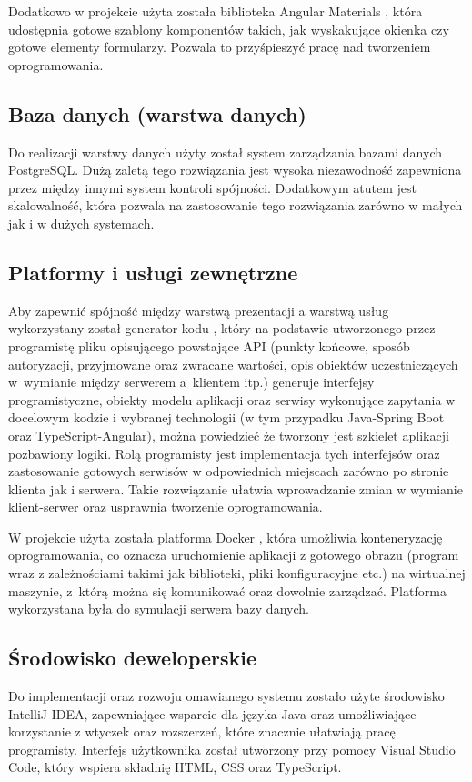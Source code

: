 Dodatkowo w projekcie użyta została biblioteka Angular Materials \cite{bib:angular_materials}, która udostępnia gotowe szablony komponentów takich, jak wyskakujące okienka czy gotowe elementy formularzy. Pozwala to przyśpieszyć pracę nad tworzeniem oprogramowania.

\subsection{Baza danych (warstwa danych)}
Do realizacji warstwy danych użyty został system zarządzania bazami danych PostgreSQL. Dużą zaletą tego rozwiązania jest wysoka niezawodność zapewniona przez między innymi system kontroli spójności. Dodatkowym atutem jest skalowalność, która pozwala na zastosowanie tego rozwiązania zarówno w małych jak i w dużych systemach. 

\subsection{Platformy i usługi zewnętrzne}
Aby zapewnić spójność między warstwą prezentacji a warstwą usług wykorzystany został generator kodu \cite{bib:openapi_generator}, który na podstawie utworzonego przez programistę pliku opisującego powstające API (punkty końcowe, sposób autoryzacji, przyjmowane oraz zwracane wartości, opis obiektów uczestniczących w~wymianie między serwerem a~klientem itp.) generuje interfejsy programistyczne, obiekty modelu aplikacji oraz serwisy wykonujące zapytania w docelowym kodzie i wybranej technologii (w tym przypadku Java-Spring Boot oraz TypeScript-Angular), można powiedzieć że tworzony jest szkielet aplikacji pozbawiony logiki. Rolą programisty jest implementacja tych interfejsów oraz zastosowanie gotowych serwisów w odpowiednich miejscach zarówno po stronie klienta jak i serwera. Takie rozwiązanie ułatwia wprowadzanie zmian w wymianie klient-serwer oraz usprawnia tworzenie oprogramowania.

W projekcie użyta została platforma Docker \cite{bib:docker}, która umożliwia konteneryzację oprogramowania, co oznacza uruchomienie aplikacji z gotowego obrazu (program wraz z zależnościami takimi jak biblioteki, pliki konfiguracyjne etc.) na wirtualnej maszynie, z~którą można się komunikować oraz dowolnie zarządzać. Platforma wykorzystana była do symulacji serwera bazy danych.

\subsection{Środowisko deweloperskie}
Do implementacji oraz rozwoju omawianego systemu zostało użyte środowisko IntelliJ IDEA, zapewniające wsparcie dla języka Java oraz umożliwiające korzystanie z wtyczek oraz rozszerzeń, które znacznie ułatwiają pracę programisty. Interfejs użytkownika został utworzony przy pomocy Visual Studio Code, który wspiera składnię HTML, CSS oraz TypeScript.